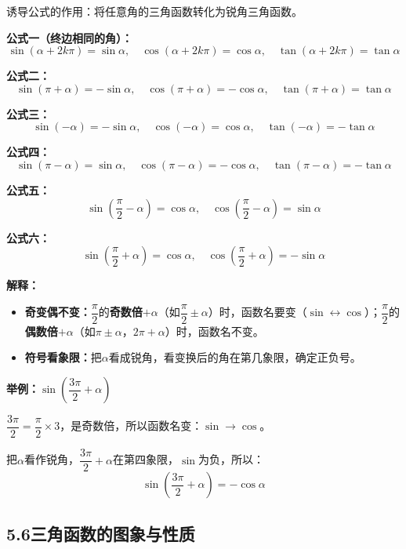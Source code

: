 \documentclass[12pt, a4paper]{ctexart}
\begin{document}
\begin{knowledgebox}[诱导公式（六组）]
诱导公式的作用：将任意角的三角函数转化为锐角三角函数。

\medskip
\textbf{公式一（终边相同的角）：}
\[
  \sin(\alpha+2k\pi)=\sin\alpha,\quad \cos(\alpha+2k\pi)=\cos\alpha,\quad \tan(\alpha+2k\pi)=\tan\alpha
\]

\textbf{公式二：}
\[
  \sin(\pi+\alpha)=-\sin\alpha,\quad \cos(\pi+\alpha)=-\cos\alpha,\quad \tan(\pi+\alpha)=\tan\alpha
\]

\textbf{公式三：}
\[
  \sin(-\alpha)=-\sin\alpha,\quad \cos(-\alpha)=\cos\alpha,\quad \tan(-\alpha)=-\tan\alpha
\]

\textbf{公式四：}
\[
  \sin(\pi-\alpha)=\sin\alpha,\quad \cos(\pi-\alpha)=-\cos\alpha,\quad \tan(\pi-\alpha)=-\tan\alpha
\]

\textbf{公式五：}
\[
  \sin\!\left(\frac{\pi}{2}-\alpha\right)=\cos\alpha,\quad \cos\!\left(\frac{\pi}{2}-\alpha\right)=\sin\alpha
\]

\textbf{公式六：}
\[
  \sin\!\left(\frac{\pi}{2}+\alpha\right)=\cos\alpha,\quad \cos\!\left(\frac{\pi}{2}+\alpha\right)=-\sin\alpha
\]
\end{knowledgebox}

\begin{tipbox}
\textbf{解释：}
\begin{itemize}[leftmargin=2em]
  \item \textbf{奇变偶不变：}$\dfrac{\pi}{2}$的\textbf{奇数倍}$+\alpha$（如$\dfrac{\pi}{2}\pm\alpha$）时，函数名要变（$\sin\leftrightarrow\cos$）；$\dfrac{\pi}{2}$的\textbf{偶数倍}$+\alpha$（如$\pi\pm\alpha$，$2\pi+\alpha$）时，函数名不变。
  \item \textbf{符号看象限：}把$\alpha$看成锐角，看变换后的角在第几象限，确定正负号。
\end{itemize}

\medskip
\textbf{举例：}$\sin\!\left(\dfrac{3\pi}{2}+\alpha\right)$

$\dfrac{3\pi}{2}=\dfrac{\pi}{2}\times3$，是奇数倍，所以函数名变：$\sin\to\cos$。

把$\alpha$看作锐角，$\dfrac{3\pi}{2}+\alpha$在第四象限，$\sin$为负，所以：
\[
  \sin\!\left(\frac{3\pi}{2}+\alpha\right)=-\cos\alpha
\]
\end{tipbox}

\subsection*{5.6\quad 三角函数的图象与性质}
\end{document}
